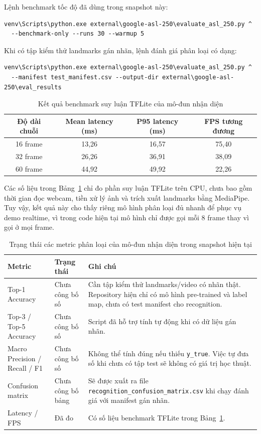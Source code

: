 Lệnh benchmark tốc độ đã dùng trong snapshot này:
\begin{verbatim}
venv\Scripts\python.exe external\google-asl-250\evaluate_asl_250.py ^
  --benchmark-only --runs 30 --warmup 5
\end{verbatim}

Khi có tập kiểm thử landmarks gán nhãn, lệnh đánh giá phân loại có dạng:
\begin{verbatim}
venv\Scripts\python.exe external\google-asl-250\evaluate_asl_250.py ^
  --manifest test_manifest.csv --output-dir external\google-asl-250\eval_results
\end{verbatim}

\begin{table}[H]
\centering
\caption{Kết quả benchmark suy luận TFLite của mô-đun nhận diện}
\label{tab:recognition-latency-benchmark}
\begin{tabularx}{\textwidth}{|c|c|c|c|}
\hline
\textbf{Độ dài chuỗi} & \textbf{Mean latency (ms)} & \textbf{P95 latency (ms)} & \textbf{FPS tương đương} \\
\hline
16 frame & 13,26 & 16,57 & 75,40 \\
\hline
32 frame & 26,26 & 36,91 & 38,09 \\
\hline
60 frame & 44,92 & 49,92 & 22,26 \\
\hline
\end{tabularx}
\end{table}

Các số liệu trong Bảng~\ref{tab:recognition-latency-benchmark} chỉ đo phần suy luận TFLite trên CPU,
chưa bao gồm thời gian đọc webcam, tiền xử lý ảnh và trích xuất landmarks bằng MediaPipe. Tuy vậy, kết
quả này cho thấy riêng mô hình phân loại đủ nhanh để phục vụ demo realtime, vì trong code hiện tại mô
hình chỉ được gọi mỗi 8 frame thay vì gọi ở mọi frame.

\begin{table}[H]
\centering
\caption{Trạng thái các metric phân loại của mô-đun nhận diện trong snapshot hiện tại}
\label{tab:recognition-classification-status}
\begin{tabularx}{\textwidth}{|p{4cm}|p{3.2cm}|X|}
\hline
\textbf{Metric} & \textbf{Trạng thái} & \textbf{Ghi chú} \\
\hline
Top-1 Accuracy & Chưa công bố số & Cần tập kiểm thử landmarks/video có nhãn thật. Repository hiện chỉ có mô hình pre-trained và label map, chưa có test manifest cho recognition. \\
\hline
Top-3 / Top-5 Accuracy & Chưa công bố số & Script đã hỗ trợ tính tự động khi có dữ liệu gán nhãn. \\
\hline
Macro Precision / Recall / F1 & Chưa công bố số & Không thể tính đúng nếu thiếu \texttt{y\_true}. Việc tự đưa số khi chưa có tập test sẽ không có giá trị học thuật. \\
\hline
Confusion matrix & Chưa công bố bảng & Sẽ được xuất ra file \texttt{recognition\_confusion\_matrix.csv} khi chạy đánh giá với manifest gán nhãn. \\
\hline
Latency / FPS & Đã đo & Có số liệu benchmark TFLite trong Bảng~\ref{tab:recognition-latency-benchmark}. \\
\hline
\end{tabularx}
\end{table}

